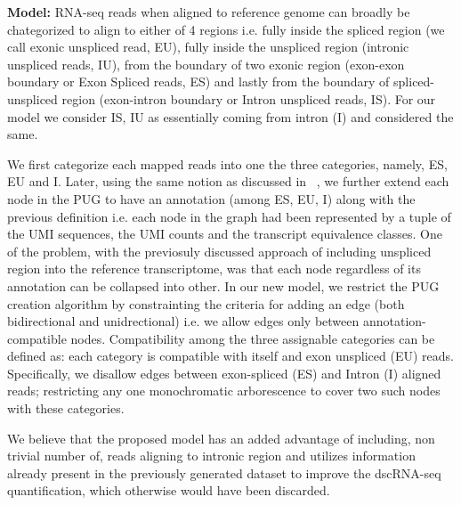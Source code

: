 \textbf{Model:} RNA-seq reads when aligned to reference genome can broadly be chategorized to 
align to either of 4 regions i.e. fully inside the spliced region (we call exonic unspliced read, EU), 
fully inside the unspliced region (intronic unspliced reads, IU),  from the boundary of two
exonic region (exon-exon boundary or Exon Spliced reads, ES) and lastly from the boundary of 
spliced-unspliced region (exon-intron boundary or Intron unspliced reads, IS). For our
model we consider IS, IU as essentially coming from intron (I) and considered the same.

We first categorize each mapped reads into one the three categories, namely, ES, EU and I.
Later, using the same notion as discussed in ~, we further extend each node in the PUG 
to have an annotation (among ES, EU, I) along with the previous definition i.e. each node in the graph
had been represented by a tuple of the UMI sequences, the UMI counts and the transcript 
equivalence classes. One of the problem, with the previosuly discussed \naive approach of including 
unspliced region into the reference transcriptome, was that each node regardless of its annotation 
can be collapsed into other. In our new model, we restrict the PUG creation algorithm by constrainting 
the criteria for adding an edge (both bidirectional and unidrectional) i.e. we allow edges only between
annotation-compatible nodes. Compatibility among the three assignable categories can be defined as:
each category is compatible with itself and exon unspliced (EU) reads. Specifically, we disallow
edges between exon-spliced (ES) and Intron (I) aligned reads; restricting any one monochromatic
arborescence to cover two such nodes with these categories.

We believe that the proposed model has an added advantage of including, non trivial number of, reads
aligning to intronic region and utilizes information already present in the previously generated
dataset to improve the dscRNA-seq quantification, which otherwise would have been discarded.


























